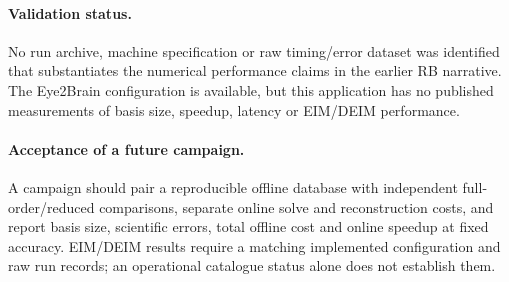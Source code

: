 \paragraph{Validation status.}
No run archive, machine specification or raw timing/error dataset was identified
that substantiates the numerical performance claims in the earlier RB narrative.
The Eye2Brain configuration is available, but this application has no
published measurements of basis size, speedup, latency or EIM/DEIM performance.

\paragraph{Acceptance of a future campaign.}
A campaign should pair a reproducible offline database with independent
full-order/reduced comparisons, separate online solve and reconstruction costs,
and report basis size, scientific errors, total offline cost and online speedup
at fixed accuracy. EIM/DEIM results require a matching implemented configuration
and raw run records; an operational catalogue status alone does not establish them.
